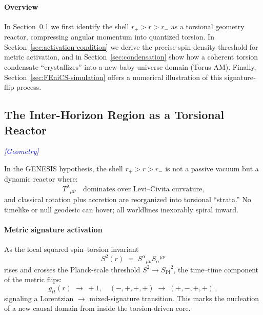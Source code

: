 \documentclass{article}
\newcommand{\Splanck}{\ensuremath{S_{\mathrm{Pl}}}}
\newcommand{\TorsionProfile}{S^2(r)}
\newcommand{\geometrytag}{\textcolor{blue}{\textit{[Geometry]}}}
\begin{document}
\paragraph{Overview}  
In Section~\ref{sec:inter-horizon} we first identify the shell $r_+>r>r_-$ as a torsional geometry reactor, compressing angular momentum into quantized torsion.  In Section~\ref{sec:activation-condition} we derive the precise spin‐density threshold for metric activation, and in Section~\ref{sec:condensation} show how a coherent torsion condensate “crystallizes” into a new baby-universe domain (Torus AM). Finally, Section~\ref{sec:FEniCS-simulation} offers a numerical illustration of this signature‐flip process.



\subsection{The Inter-Horizon Region as a Torsional Reactor}
\label{sec:inter-horizon}
\geometrytag

In the GENESIS hypothesis, the shell $r_+ > r > r_-$ is not a passive vacuum but a dynamic reactor where:
\begin{equation}\label{eq:auto26}
T^{\lambda}{}_{\mu\nu}\quad\text{dominates over Levi–Civita curvature,}
\end{equation}
and classical rotation plus accretion are reorganized into torsional “strata.”  
No timelike or null geodesic can hover; all worldlines inexorably spiral inward.

\paragraph{Metric signature activation}
As the local squared spin–torsion invariant
\begin{equation}\label{eq:auto27}
\TorsionProfile \;=\; S^\alpha{}_{\mu\nu}S_\alpha{}^{\mu\nu}
\end{equation}
rises and crosses the Planck-scale threshold $S^2 \rightarrow \Splanck^2$, the time–time component of the metric flips:
\begin{equation}\label{eq:auto28}
g_{tt}(r)\;\longrightarrow\;+1,
  \quad
  (-,+,+,+)\;\longrightarrow\;(+,-,+,+)\,,
\tag{10}
\end{equation}
signaling a Lorentzian $\to$ mixed-signature transition. This marks the nucleation of a new causal domain from inside the torsion-driven core.
\end{document}
